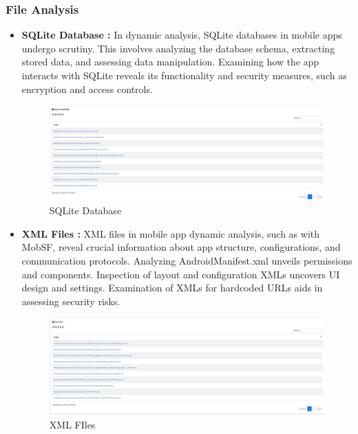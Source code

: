 \documentclass{report}
\begin{document}
\subsubsection{File Analysis}
\begin{itemize}
    \item \textbf {SQLite Database : }In dynamic analysis, SQLite databases in mobile apps undergo scrutiny. This involves analyzing the database schema, extracting stored data, and assessing data manipulation. Examining how the app interacts with SQLite reveals its functionality and security measures, such as encryption and access controls. 
    \begin{figure}[hbt!]
    \centering
    \includegraphics[width=1\linewidth]{Dynamic Analyzer/sqlite.jpg}
    \caption{SQLite Database}
    \label{fig:example}
    \end{figure}
    \FloatBarrier

    \item \textbf {XML Files : }
    XML files in mobile app dynamic analysis, such as with MobSF, reveal crucial information about app structure, configurations, and communication protocols. Analyzing AndroidManifest.xml unveils permissions and components. Inspection of layout and configuration XMLs uncovers UI design and settings. Examination of XMLs for hardcoded URLs aids in assessing security risks. 
    \begin{figure}[hbt!]
    \centering
    \includegraphics[width=1\linewidth]{Dynamic Analyzer/xml.jpg}
    \caption{XML FIles}
    \label{fig:example}
    \end{figure}
    \FloatBarrier


\end{itemize}
\end{document}
